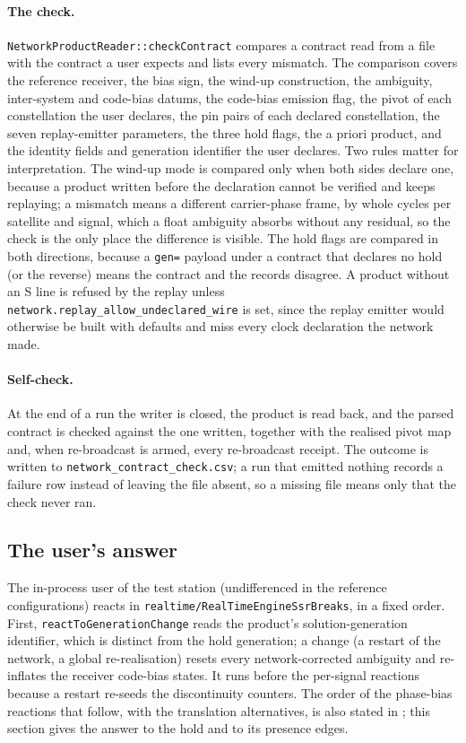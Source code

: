 \documentclass[main.tex]{subfiles}
\begin{document}
\paragraph{The check.}
\texttt{NetworkProductReader::checkContract} compares a contract read from a
file with the contract a user expects and lists every mismatch. The
comparison covers the reference receiver, the bias sign, the wind-up
construction, the ambiguity, inter-system and code-bias datums, the
code-bias emission flag, the pivot of each constellation the user declares,
the pin pairs of each declared constellation, the seven replay-emitter
parameters, the three hold flags, the a priori product, and the identity
fields and generation identifier the user declares. Two rules matter for
interpretation. The wind-up mode is compared only when both sides declare
one, because a product written before the declaration cannot be verified and
keeps replaying; a mismatch means a different carrier-phase frame, by whole
cycles per satellite and signal, which a float ambiguity absorbs without any
residual, so the check is the only place the difference is visible. The hold
flags are compared in both directions, because a \texttt{gen=} payload under a
contract that declares no hold (or the reverse) means the contract and the
records disagree. A product without an S line is refused by the replay
unless \texttt{network.replay\_allow\_undeclared\_wire} is set, since the
replay emitter would otherwise be built with defaults and miss every clock
declaration the network made.

\paragraph{Self-check.}
At the end of a run the writer is closed, the product is read back, and the
parsed contract is checked against the one written, together with the
realised pivot map and, when re-broadcast is armed, every re-broadcast
receipt. The outcome is written to \texttt{network\_contract\_check.csv}; a
run that emitted nothing records a failure row instead of leaving the file
absent, so a missing file means only that the check never ran.

\subsection{The user's answer}\label{sec:net-wire-consumer}

The in-process user of the test station (undifferenced in the reference
configurations) reacts in
\texttt{realtime/RealTimeEngine\allowbreak SsrBreaks}, in a fixed order.
First, \texttt{reactToGenerationChange} reads the product's
solution-generation identifier, which is distinct from the hold generation;
a change (a restart of the network, a global re-realisation) resets every
network-corrected ambiguity and re-inflates the receiver code-bias states.
It runs before the per-signal reactions because a restart re-seeds the
discontinuity counters.
The order of the phase-bias reactions that follow, with the translation
alternatives, is also stated in ; this section gives the answer to the hold and
to its presence edges.
\end{document}
